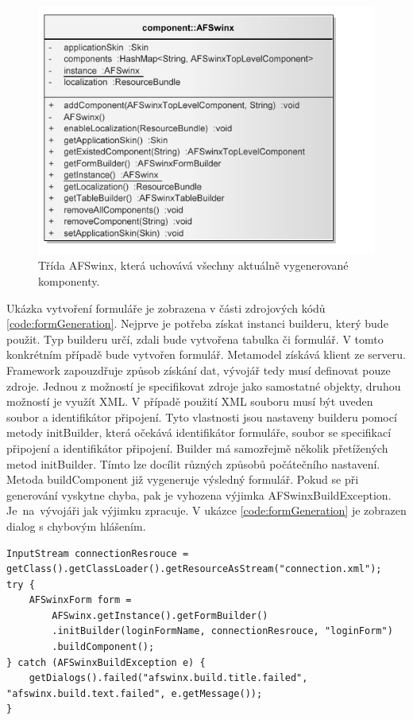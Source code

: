 \begin{figure}[h!]
\begin{center}
\includegraphics{images/afSwinx}
\caption{Třída AFSwinx, která uchovává všechny aktuálně vygenerované komponenty.}
\label{img:afSwinx}
\end{center}
\end{figure}	

Ukázka vytvoření formuláře je zobrazena v části zdrojových kódů \ref{code:formGeneration}. Nejprve je potřeba získat instanci builderu, který bude použit. Typ builderu určí, zdali bude vytvořena tabulka či formulář. V tomto konkrétním případě bude vytvořen formulář. Metamodel získává klient ze serveru. Framework zapouzdřuje způsob získání dat, vývojář tedy musí definovat pouze zdroje. Jednou z možností je specifikovat zdroje jako samostatné objekty, druhou možností je využít XML. V případě použití XML souboru musí být uveden soubor a identifikátor připojení. Tyto vlastnosti jsou nastaveny builderu pomocí metody initBuilder, která očekává identifikátor formuláře, soubor se specifikací připojení a identifikátor připojení. Builder má samozřejmě několik přetížených metod initBuilder. Tímto lze docílit různých způsobů počátečního nastavení. Metoda buildComponent již vygeneruje výsledný formulář. Pokud se při generování vyskytne chyba, pak je vyhozena výjimka AFSwinxBuildException. Je~na~vývojáři jak výjimku zpracuje. V ukázce \ref{code:formGeneration} je zobrazen dialog s chybovým hlášením.

\begin{lstlisting}[caption={Generování formuláře na klientovi},
label={code:formGeneration}, basicstyle=\footnotesize]
InputStream connectionResrouce = getClass().getClassLoader().getResourceAsStream("connection.xml");
try {
	AFSwinxForm form =
		AFSwinx.getInstance().getFormBuilder()
		.initBuilder(loginFormName, connectionResrouce, "loginForm")
		.buildComponent();
} catch (AFSwinxBuildException e) {
	getDialogs().failed("afswinx.build.title.failed", "afswinx.build.text.failed", e.getMessage());
}
\end{lstlisting}

